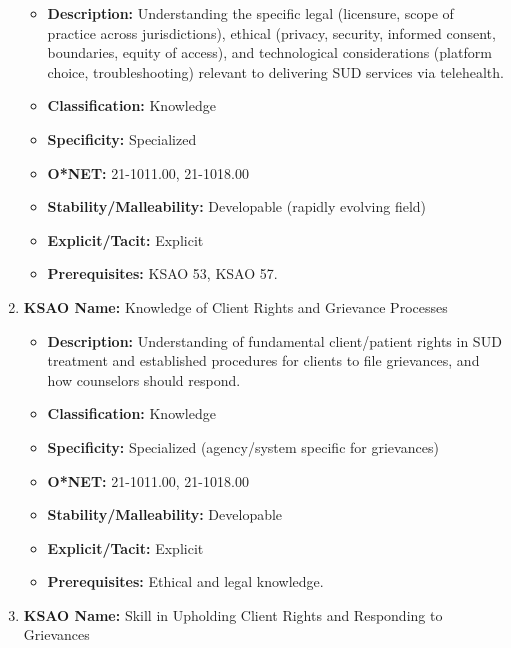 \documentclass[
  letterpaper,
  DIV=11,
  numbers=noendperiod]{scrartcl}
\providecommand{\tightlist}{%
  \setlength{\itemsep}{0pt}\setlength{\parskip}{0pt}}
\begin{document}
\begin{enumerate}
  \begin{itemize}
  \tightlist
  \item
    \textbf{Description:} Understanding the specific legal (licensure,
    scope of practice across jurisdictions), ethical (privacy, security,
    informed consent, boundaries, equity of access), and technological
    considerations (platform choice, troubleshooting) relevant to
    delivering SUD services via telehealth.
  \item
    \textbf{Classification:} Knowledge
  \item
    \textbf{Specificity:} Specialized
  \item
    \textbf{O*NET:} 21-1011.00, 21-1018.00
  \item
    \textbf{Stability/Malleability:} Developable (rapidly evolving
    field)
  \item
    \textbf{Explicit/Tacit:} Explicit
  \item
    \textbf{Prerequisites:} KSAO 53, KSAO 57.
  \end{itemize}
\item
  \textbf{KSAO Name:} Knowledge of Client Rights and Grievance Processes

  \begin{itemize}
  \tightlist
  \item
    \textbf{Description:} Understanding of fundamental client/patient
    rights in SUD treatment and established procedures for clients to
    file grievances, and how counselors should respond.
  \item
    \textbf{Classification:} Knowledge
  \item
    \textbf{Specificity:} Specialized (agency/system specific for
    grievances)
  \item
    \textbf{O*NET:} 21-1011.00, 21-1018.00
  \item
    \textbf{Stability/Malleability:} Developable
  \item
    \textbf{Explicit/Tacit:} Explicit
  \item
    \textbf{Prerequisites:} Ethical and legal knowledge.
  \end{itemize}
\item
  \textbf{KSAO Name:} Skill in Upholding Client Rights and Responding to
  Grievances


\end{enumerate}
\end{document}
